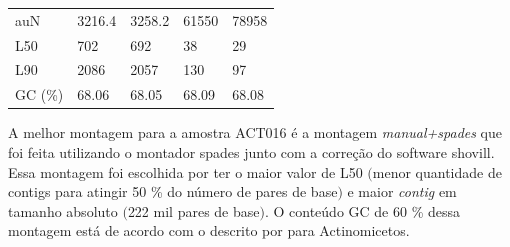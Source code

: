 \begin{table}[htb]
{\begin{tabular}{lllll}
		auN                                          & 3216.4                                 & 3258.2                                  & 61550                             & 78958                                                  \\
		L50                                          & 702                                    & 692                                     & 38                                & 29                                                             \\
		L90                                          & 2086                                   & 2057                                    & 130                               & 97                                                                 \\
		GC (\%)                                      & 68.06                                  & 68.05                                   & 68.09                             & 68.08                                                        \\
	\bottomrule
    \end{tabular}
	}{%
	\centering
	  }
\end{table}


A melhor montagem para a amostra ACT016 é a montagem \textit{manual+spades} que foi feita utilizando
o montador spades junto com a correção do software shovill. Essa montagem foi escolhida por ter o maior
valor de L50 $($menor quantidade de contigs para atingir 50 \% do número de pares de base$)$ e maior 
\textit{contig} em tamanho absoluto $($222 mil pares de base$)$. O conteúdo GC de 60 \% dessa montagem está de acordo
com o descrito por  para Actinomicetos.

